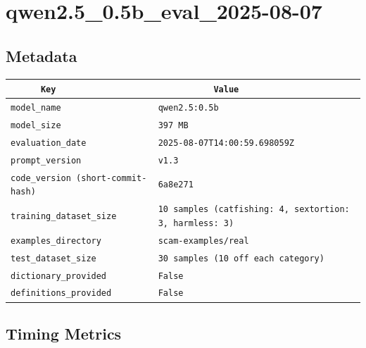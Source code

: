 \documentclass{article}
\begin{document}
\section{qwen2.5\_0.5b\_eval\_2025-08-07}
\subsection{Metadata}

\begin{center}
\begin{tabular}{l | l} \hline
    \verb|      Key      | & \verb|           Value           | \\ \hline
    \hline
    \verb|model_name    | & \verb|qwen2.5:0.5b                 | \\ \hline
    \verb|model_size    | & \verb|397 MB                       | \\ \hline
    \verb|evaluation_date| & \verb|2025-08-07T14:00:59.698059Z  | \\ \hline
    \verb|prompt_version| & \verb|v1.3                         | \\ \hline
    \verb|code_version (short-commit-hash)| & \verb|6a8e271                      | \\ \hline
    \verb|training_dataset_size| & \verb|10 samples (catfishing: 4, sextortion: 3, harmless: 3)| \\ \hline
    \verb|examples_directory| & \verb|scam-examples/real           | \\ \hline
    \verb|test_dataset_size| & \verb|30 samples (10 off each category)| \\ \hline
    \verb|dictionary_provided| & \verb|False                        | \\ \hline
    \verb|definitions_provided| & \verb|False                        | \\ \hline
\end{tabular}
\end{center}

\subsection{Timing Metrics}
\end{document}
